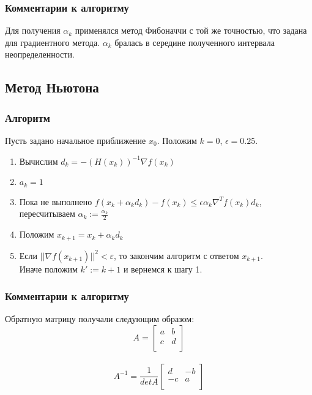 \subsubsection{Комментарии к алгоритму}
Для получения $\alpha_k$ применялся метод Фибоначчи с той же точностью, что задана для градиентного метода. $\alpha_k$ бралась в середине полученного интервала неопределенности.

\subsection{Метод Ньютона}
\subsubsection{Алгоритм}
Пусть задано начальное приближение $x_0$. Положим $k=0$, $\epsilon=0.25$.
\begin{enumerate}
  \item Вычислим $d_k=-(H(x_k))^{-1}\nabla f(x_k)$
  \item $a_k=1$
  \item Пока не выполнено $f(x_k+\alpha_k d_k)-f(x_k) \leq \epsilon \alpha_k \nabla^T f(x_k)d_k$, пересчитываем $\alpha_k:=\frac{\alpha_k}{2}$
  \item Положим $x_{k+1}=x_k+\alpha_k d_k$
  \item Если $||\nabla f(x_{k+1})||^2 < \varepsilon$, то закончим алгоритм с ответом $x_{k+1}$.\\
  Иначе положим $k':=k+1$ и вернемся к шагу 1. 
\end{enumerate}

\subsubsection{Комментарии к алгоритму}
Обратную матрицу получали следующим образом:
\[A=
\begin{bmatrix}
    a & b\\
    c & d\\
\end{bmatrix}
\]\\
\[A^{-1}=\frac{1}{det A}
\begin{bmatrix}
    d & -b\\
    -c & a\\
\end{bmatrix}
\]

